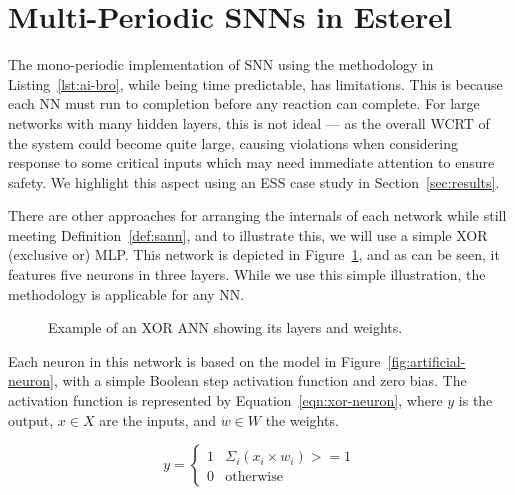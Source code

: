 \section{Multi-Periodic \acp{SNN} in Esterel}
\label{sec:esterel-mapping}

The mono-periodic implementation of \ac{SNN} using the methodology in Listing~\ref{lst:ai-bro}, while being time predictable, has limitations.
This is because each \ac{NN} must run to completion before any reaction can complete. 
For large networks with many hidden layers, this is not ideal --- as
the overall \ac{WCRT} of the system could become quite large, causing
violations when considering response to some critical inputs which may
need immediate attention to ensure safety. We highlight this aspect
using an \acf{ESS} case study in Section~\ref{sec:results}.

There are other approaches for arranging the internals of each network while still meeting Definition~\ref{def:sann}, and to illustrate this, we will use a simple XOR (exclusive or) \ac{MLP}.
This network is depicted in Figure~\ref{fig:xor-ann}, and as can be seen, it features five neurons in three layers. While we use this simple illustration, the 
methodology is applicable for any \ac{NN}.

\begin{figure}[h]
	\centering
	\scalebox{0.8}{}
	\caption{Example of an XOR \ac{ANN} showing its layers and weights.	\label{fig:xor-ann}}
\end{figure}

Each neuron in this network is based on the model in Figure~\ref{fig:artificial-neuron}, with a simple Boolean step activation function and zero bias. 
The activation function is represented by Equation~\ref{eqn:xor-neuron}, where $y$ is the output, $x \in X$ are the inputs, and $w \in W$ the weights.

\begin{equation}
y =
\begin{cases}
1 & \text{$\Sigma_{i} \left(x_i \times w_i\right) >= 1$} \\
0 & \text{otherwise}
\end{cases}
\label{eqn:xor-neuron}
\end{equation}

